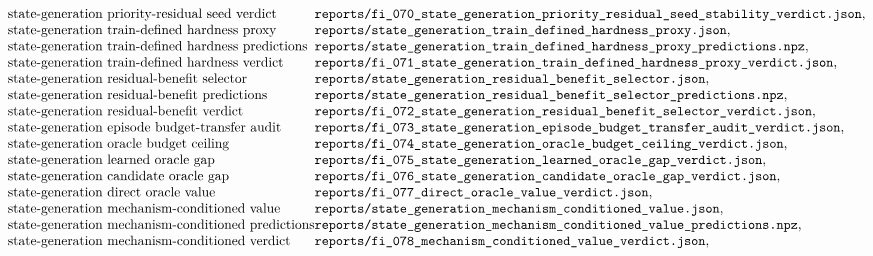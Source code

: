 $$\begin{array}{@{}l@{}l@{}}
\text{state-generation priority-residual seed verdict} & \texttt{reports/fi\_070\_state\_generation\_priority\_residual\_seed\_stability\_verdict.json},\\
\text{state-generation train-defined hardness proxy} & \texttt{reports/state\_generation\_train\_defined\_hardness\_proxy.json},\\
\text{state-generation train-defined hardness predictions} & \texttt{reports/state\_generation\_train\_defined\_hardness\_proxy\_predictions.npz},\\
\text{state-generation train-defined hardness verdict} & \texttt{reports/fi\_071\_state\_generation\_train\_defined\_hardness\_proxy\_verdict.json},\\
\text{state-generation residual-benefit selector} & \texttt{reports/state\_generation\_residual\_benefit\_selector.json},\\
\text{state-generation residual-benefit predictions} & \texttt{reports/state\_generation\_residual\_benefit\_selector\_predictions.npz},\\
\text{state-generation residual-benefit verdict} & \texttt{reports/fi\_072\_state\_generation\_residual\_benefit\_selector\_verdict.json},\\
\text{state-generation episode budget-transfer audit} & \texttt{reports/fi\_073\_state\_generation\_episode\_budget\_transfer\_audit\_verdict.json},\\
\text{state-generation oracle budget ceiling} & \texttt{reports/fi\_074\_state\_generation\_oracle\_budget\_ceiling\_verdict.json},\\
\text{state-generation learned oracle gap} & \texttt{reports/fi\_075\_state\_generation\_learned\_oracle\_gap\_verdict.json},\\
\text{state-generation candidate oracle gap} & \texttt{reports/fi\_076\_state\_generation\_candidate\_oracle\_gap\_verdict.json},\\
\text{state-generation direct oracle value} & \texttt{reports/fi\_077\_direct\_oracle\_value\_verdict.json},\\
\text{state-generation mechanism-conditioned value} & \texttt{reports/state\_generation\_mechanism\_conditioned\_value.json},\\
\text{state-generation mechanism-conditioned predictions} & \texttt{reports/state\_generation\_mechanism\_conditioned\_value\_predictions.npz},\\
\text{state-generation mechanism-conditioned verdict} & \texttt{reports/fi\_078\_mechanism\_conditioned\_value\_verdict.json},\\

\end{array}$$
